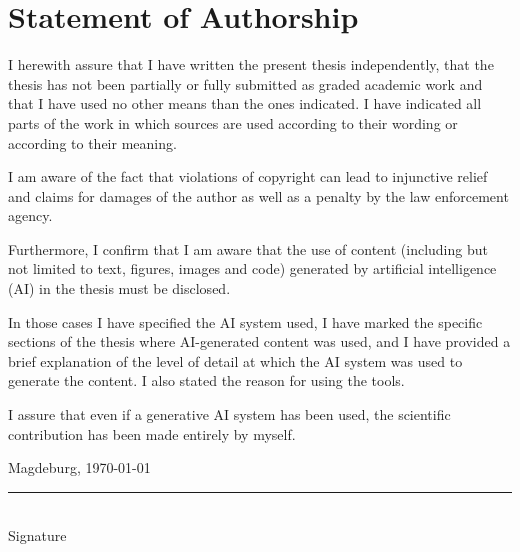 \documentclass[
  12pt,
  a4paper,
  printlength,
  bibliography=totoc,
  chapterprefix,
  headings=openright,
  numbers=endperiod,
  parskip=half,
  twoside
]{scrreprt}
\begin{document}




\printbibliography

\appendix




\section*{Statement of Authorship}

I herewith assure that I have written the present thesis independently, that the thesis has not been
partially or fully submitted as graded academic work and that I have used no other means than the
ones indicated. I have indicated all parts of the work in which sources are used according to their
wording or according to their meaning.

I am aware of the fact that violations of copyright can lead to injunctive relief and claims for damages
of the author as well as a penalty by the law enforcement agency.

Furthermore, I confirm that I am aware that the use of content (including but not limited to text,
figures, images and code) generated by artificial intelligence (AI) in the thesis must be disclosed. 

In those cases I have specified the AI system used, I have marked the specific sections of the thesis
where AI-generated content was used, and I have provided a brief explanation of the level of detail at
which the AI system was used to generate the content. I also stated the reason for using the tools.

I assure that even if a generative AI system has been used, the scientific contribution has been made
entirely by myself.

\bigskip

Magdeburg, \today

\bigskip
\bigskip

\rule{0.5\textwidth}{0.5pt}\\
\hspace*{0.25em}Signature
\end{document}

